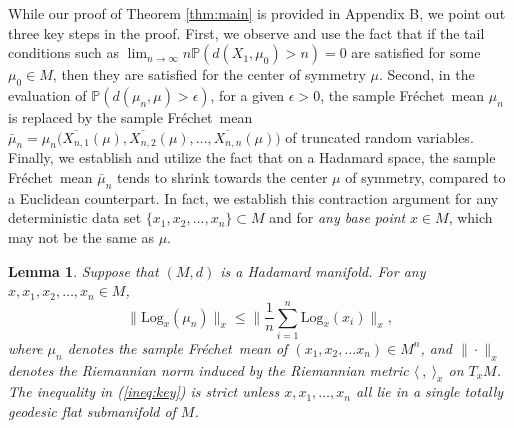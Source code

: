 \documentclass[preprint]{imsart}
\def\Frechet{Fr\'{e}chet}
\theoremstyle{plain}
\newtheorem{lemma}{Lemma}
\theoremstyle{remark}
\begin{document}
 
While our proof of Theorem \ref{thm:main} is provided in Appendix B, we point out three key steps in the proof. First, we observe and use the fact that if the tail conditions such as $\lim_{n\to\infty} n \mathbb{P}(d(X_1,\mu_0)>n)=0$ are satisfied for some $\mu_0\in M$, then they are satisfied for the center of symmetry $\mu$. Second, in the evaluation of $\mathbb{P}(d(\mu_n,\mu) > \epsilon)$, for a given $\epsilon>0$, the sample \Frechet\ mean $\mu_n$ is replaced by the sample \Frechet\ mean $\bar\mu_n = \mu_n\big(\overline{X_{n, 1}}(\mu), \overline{X_{n, 2}}(\mu), \ldots, \overline{X_{n, n}}(\mu)\big)$ of truncated random variables. Finally, we establish and utilize the fact that on a Hadamard space, the sample \Frechet\ mean $\bar\mu_n$ tends to shrink towards the center $\mu$ of symmetry, compared to a Euclidean counterpart. In fact, we establish this contraction argument for any deterministic data set $\{x_1, x_2, \ldots,x_n\} \subset M$ and for \textit{any base point} $x \in M$, which may not be the same as $\mu$. 


\begin{lemma}\label{lem:Hada}
Suppose that $(M,d)$ is a Hadamard manifold. For any $x,x_1, x_2,\ldots,x_n \in M$, 
\begin{equation}\label{ineq:key}
\|\mbox{Log}_{x}(\mu_{n}) \|_{x} \le  \|\frac{1}{n}\sum_{i=1}^{n}\mbox{Log}_{x}(x_i) \|_{x},
\end{equation}
where $\mu_{n}$ denotes the sample \Frechet\ mean of $(x_1, x_2, \ldots x_n) \in M^n$, and $\|\cdot\|_{x}$ denotes the Riemannian norm induced by the Riemannian metric $\langle ~,~\rangle_{x}$ on $T_{x}M$. The inequality in (\ref{ineq:key}) is strict unless $x,x_1,…,x_n$ all lie in a single totally geodesic flat submanifold of $M$.
\end{lemma}

\end{document}
